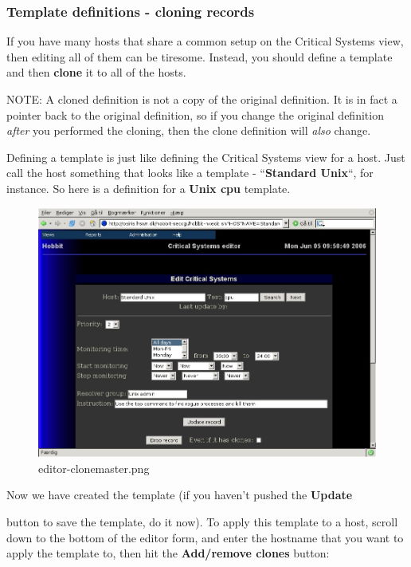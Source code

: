 \subsubsection{Template definitions - cloning records}


 If you have many hosts that share a common setup on the Critical
 Systems view, then editing all of them can be tiresome. Instead, you
 should define a template and then \textbf{clone} it to all of the
 hosts.



 NOTE: A cloned definition is not a copy of the original
 definition. It is in fact a pointer back to the original definition,
 so if you change the original definition \emph{after} you performed
 the cloning, then the clone definition will \emph{also} change.



 Defining a template is just like defining the Critical Systems view
 for a host. Just call the host something that looks like a template -
 ``\textbf{Standard Unix}``, for instance. So here is a definition for
 a \textbf{Unix cpu}  template. 

\begin{figure} \centering \caption{editor-clonemaster.png}\label{editor-clonemaster.png}
\includegraphics[scale=0.5]{./editor-clonemaster.png} 
\end{figure}

 Now we have created the template (if you haven't pushed the
 \textbf{Update}

 button to save the template, do it now). To apply this template to a
 host, scroll down to the bottom of the editor form, and enter the
 hostname that you want to apply the template to, then hit the
 \textbf{Add/remove clones} button: 

